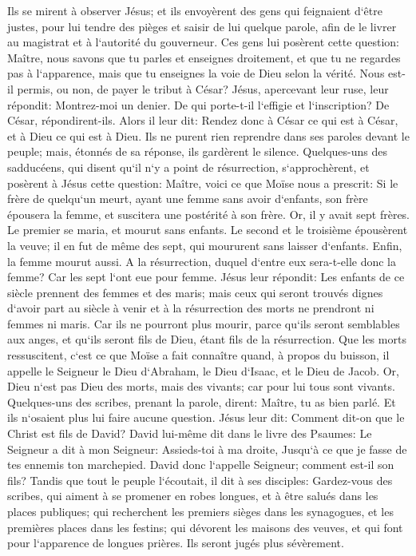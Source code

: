 \verse Ils se mirent à observer Jésus; et ils envoyèrent des gens qui feignaient d`être justes, pour lui tendre des pièges et saisir de lui quelque parole, afin de le livrer au magistrat et à l`autorité du gouverneur. 
\verse Ces gens lui posèrent cette question: Maître, nous savons que tu parles et enseignes droitement, et que tu ne regardes pas à l`apparence, mais que tu enseignes la voie de Dieu selon la vérité. 
\verse Nous est-il permis, ou non, de payer le tribut à César? 
\verse Jésus, apercevant leur ruse, leur répondit: Montrez-moi un denier. 
\verse De qui porte-t-il l`effigie et l`inscription? De César, répondirent-ils. 
\verse Alors il leur dit: Rendez donc à César ce qui est à César, et à Dieu ce qui est à Dieu. 
\verse Ils ne purent rien reprendre dans ses paroles devant le peuple; mais, étonnés de sa réponse, ils gardèrent le silence. 
\verse Quelques-uns des sadducéens, qui disent qu`il n`y a point de résurrection, s`approchèrent, et posèrent à Jésus cette question: 
\verse Maître, voici ce que Moïse nous a prescrit: Si le frère de quelqu`un meurt, ayant une femme sans avoir d`enfants, son frère épousera la femme, et suscitera une postérité à son frère. 
\verse Or, il y avait sept frères. Le premier se maria, et mourut sans enfants. 
\verse Le second et le troisième épousèrent la veuve; 
\verse il en fut de même des sept, qui moururent sans laisser d`enfants. 
\verse Enfin, la femme mourut aussi. 
\verse A la résurrection, duquel d`entre eux sera-t-elle donc la femme? Car les sept l`ont eue pour femme. 
\verse Jésus leur répondit: Les enfants de ce siècle prennent des femmes et des maris; 
\verse mais ceux qui seront trouvés dignes d`avoir part au siècle à venir et à la résurrection des morts ne prendront ni femmes ni maris. 
\verse Car ils ne pourront plus mourir, parce qu`ils seront semblables aux anges, et qu`ils seront fils de Dieu, étant fils de la résurrection. 
\verse Que les morts ressuscitent, c`est ce que Moïse a fait connaître quand, à propos du buisson, il appelle le Seigneur le Dieu d`Abraham, le Dieu d`Isaac, et le Dieu de Jacob. 
\verse Or, Dieu n`est pas Dieu des morts, mais des vivants; car pour lui tous sont vivants. 
\verse Quelques-uns des scribes, prenant la parole, dirent: Maître, tu as bien parlé. 
\verse Et ils n`osaient plus lui faire aucune question. 
\verse Jésus leur dit: Comment dit-on que le Christ est fils de David? 
\verse David lui-même dit dans le livre des Psaumes: Le Seigneur a dit à mon Seigneur: Assieds-toi à ma droite, 
\verse Jusqu`à ce que je fasse de tes ennemis ton marchepied. 
\verse David donc l`appelle Seigneur; comment est-il son fils? 
\verse Tandis que tout le peuple l`écoutait, il dit à ses disciples: 
\verse Gardez-vous des scribes, qui aiment à se promener en robes longues, et à être salués dans les places publiques; qui recherchent les premiers sièges dans les synagogues, et les premières places dans les festins; 
\verse qui dévorent les maisons des veuves, et qui font pour l`apparence de longues prières. Ils seront jugés plus sévèrement. 

